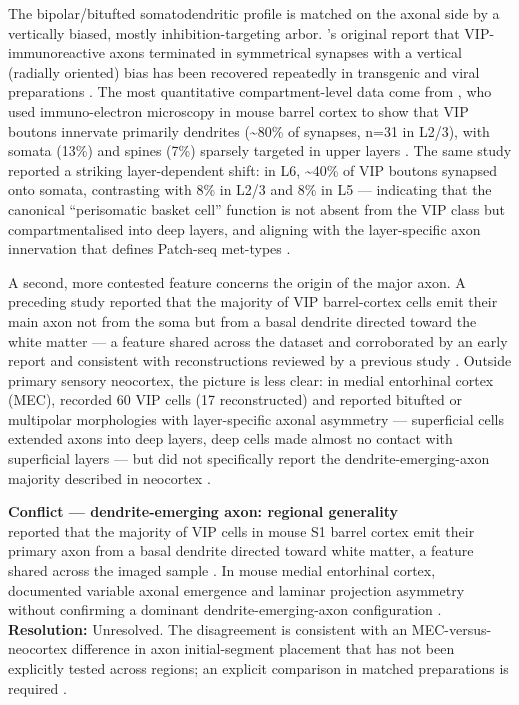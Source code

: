 \documentclass[11pt]{article}
\begin{document}
The bipolar/bitufted somatodendritic profile is matched on the axonal side by a vertically biased, mostly inhibition-targeting arbor. \citet{Kawaguchi1996}'s original report that VIP-immunoreactive axons terminated in symmetrical synapses with a vertical (radially oriented) bias has been recovered repeatedly in transgenic and viral preparations \citep{Kawaguchi1996, Cauli2014, Apicella2022, Pronneke2015}. The most quantitative compartment-level data come from \citet{Zhou2017}, who used immuno-electron microscopy in mouse barrel cortex to show that VIP boutons innervate primarily dendrites ({\textasciitilde}80\% of synapses, n=31 in L2/3), with somata (13\%) and spines (7\%) sparsely targeted in upper layers \citep{Zhou2017, Lee2013, Gulyas1996, Apicella2022}. The same study reported a striking layer-dependent shift: in L6, {\textasciitilde}40\% of VIP boutons synapsed onto somata, contrasting with 8\% in L2/3 and 8\% in L5 --- indicating that the canonical ``perisomatic basket cell'' function is not absent from the VIP class but compartmentalised into deep layers, and aligning with the layer-specific axon innervation that defines Patch-seq met-types \citep{Gouwens2020a, Schneidermizell2025, Gamlin2025}.

A second, more contested feature concerns the origin of the major axon. A preceding study reported that the majority of VIP barrel-cortex cells emit their main axon not from the soma but from a basal dendrite directed toward the white matter --- a feature shared across the dataset and corroborated by an early report and consistent with reconstructions reviewed by a previous study \citep{Kawaguchi1996}. Outside primary sensory neocortex, the picture is less clear: in medial entorhinal cortex (MEC), \citet{Badrinarayanan2021} recorded 60 VIP cells (17 reconstructed) and reported bitufted or multipolar morphologies with layer-specific axonal asymmetry --- superficial cells extended axons into deep layers, deep cells made almost no contact with superficial layers --- but did not specifically report the dendrite-emerging-axon majority described in neocortex \citep{Badrinarayanan2021, Apicella2022}.

\begin{framed}
\textbf{Conflict --- dendrite-emerging axon: regional generality}\\
\citet{Pronneke2015} reported that the majority of VIP cells in mouse S1 barrel cortex emit their primary axon from a basal dendrite directed toward white matter, a feature shared across the imaged sample \citep{Pronneke2015}. In mouse medial entorhinal cortex, \citet{Badrinarayanan2021} documented variable axonal emergence and laminar projection asymmetry without confirming a dominant dendrite-emerging-axon configuration \citep{Badrinarayanan2021}. \textbf{Resolution:} Unresolved. The disagreement is consistent with an MEC-versus-neocortex difference in axon initial-segment placement that has not been explicitly tested across regions; an explicit comparison in matched preparations is required \citep{Badrinarayanan2021}.
\end{framed}
\end{document}
